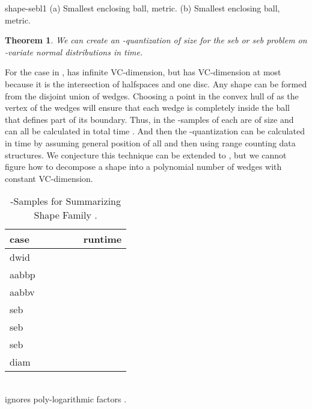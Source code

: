 \documentclass{journal}
\newtheorem {theorem}{Theorem}[section]
\begin{document}
 {shape-sebl1}
{(a) Smallest enclosing ball,  metric. (b) Smallest enclosing ball,  metric.}

\begin{theorem}
We can create an -quantization of size  for the \textsf{seb} or \textsf{seb} problem on  -variate normal distributions in  time.
\end{theorem}


For the  case in ,
 has infinite VC-dimension, but  has VC-dimension at most  because it is the intersection of  halfspaces and one disc.
Any shape  can be formed from the disjoint union of  wedges.  Choosing a point in the convex hull of  as the vertex of the wedges will ensure that each wedge is completely inside the ball that defines part of its boundary.  Thus, in  the  -samples of each  are of size  and can all be calculated in total time .  And then
the -quantization can be calculated in  time by assuming general position of all  and then using range counting data structures.
We conjecture this technique can be extended to , but we cannot figure how to decompose a shape  into a polynomial number of wedges with constant VC-dimension.

       \begin{table}[h!!t]
      \caption{-Samples for Summarizing Shape Family .}
      \small
      \centering
      \begin{tabular}{|l|c|c|c|c|c|}
      \hline
      case &  &  &  &  & runtime
      \\ \hline \hline
      \textsf{dwid} &  &  &  &  & 
      \\ \hline
      \textsf{aabbp} &  &  &  &  & 
      \\ \hline
      \textsf{aabbv} &  &  &  &  & 
      \\ \hline
      \textsf{seb} &  &  &  &  & 
      \\ \hline
      \textsf{seb} &  &  &  &  & 
      \\ \hline
      \textsf{seb}  &  &  & \hspace{-.06in} &  & 
      \\ \hline
      \textsf{diam}  &   &  &  &  & 
      \\ \hline
     \end{tabular}
      \label{tbl:Afn-size}
      \\   ignores poly-logarithmic factors .
      \end{table}
\end{document}
